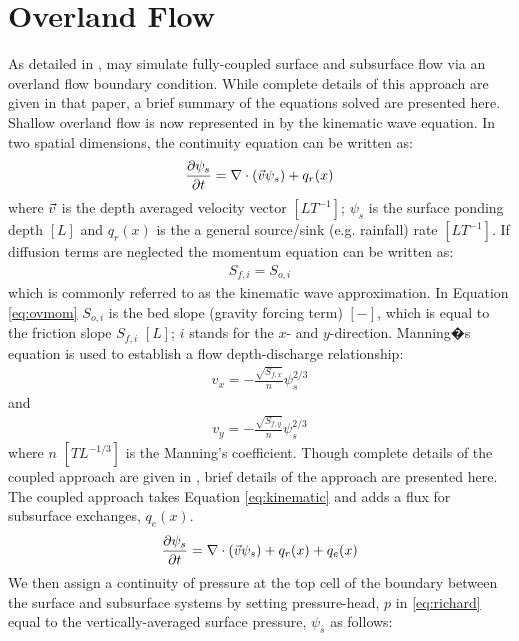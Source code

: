 \section{Overland Flow}
\label{Overland Flow}
As detailed in \cite{KM06}, \parflow{} may simulate fully-coupled surface and subsurface flow via an overland flow boundary condition.  While complete details of this approach are given in that paper, a brief summary of the equations solved are presented here.  Shallow overland flow is now represented in \parflow{} by the kinematic wave equation.   In two spatial dimensions, the continuity equation can be written as:
\begin{eqnarray}
\frac{\partial \psi_s}{\partial t} =
\nabla \cdot ({\vec v}\psi_s) + q_r(x)
\label{eq:kinematic}
\end{eqnarray}
where ${\vec v}$ is the depth averaged velocity vector $[LT^{-1}]$; $\psi_s$ is the surface ponding depth $[L]$ and $q_r(x)$ is the a general source/sink (e.g. rainfall) rate $[LT^{-1}]$. If diffusion terms are neglected the momentum equation can be written as:
\begin{eqnarray}
S_{f,i} = S_{o,i}
\label{eq:ovmom}
\end{eqnarray}
which is commonly referred to as the kinematic wave approximation. In Equation \ref{eq:ovmom} $S_{o,i}$ is the bed slope (gravity forcing term) $[-]$, which is equal to the friction slope $S_{f,i}$ $[L]$; $i$ stands for the $x$- and $y$-direction. Manning�s equation is used to establish a flow depth-discharge relationship:
\begin{eqnarray}
v_x=- \frac{\sqrt{S_{f,x}}}{n}\psi_{s}^{2/3}
\label{eq:manningsx}
\end{eqnarray}
and
\begin{eqnarray}
v_y=- \frac{\sqrt{S_{f,y}}}{n}\psi_{s}^{2/3}
\label{eq:manningsy}
\end{eqnarray}
where $n$ $[TL^{-1/3}]$ is the Manning's coefficient.\newline
Though complete details of the coupled approach are given in \cite{KM06}, brief details of the approach are presented here.  The coupled approach takes Equation \ref{eq:kinematic} and adds a flux for subsurface exchanges, $q_e(x)$.
\begin{eqnarray}
\frac{\partial \psi_s}{\partial t} =
\nabla \cdot ({\vec v}\psi_s) + q_r(x) + q_e(x)
\label{eq:kinematic_ex}
\end{eqnarray}
We then assign a continuity of pressure at the top cell of the boundary between the surface and subsurface systems by setting pressure-head, $p$ in \ref{eq:richard} equal to the vertically-averaged surface pressure, $\psi_s$ as follows:

